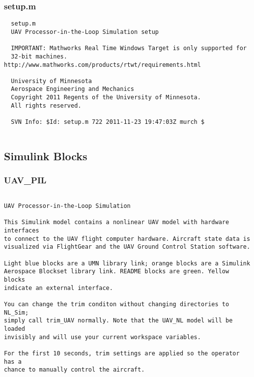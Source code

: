 \documentclass[12pt]{article}
\begin{document}
\subsubsection{setup.m}
\begin{verbatim}
  setup.m
  UAV Processor-in-the-Loop Simulation setup
 
  IMPORTANT: Mathworks Real Time Windows Target is only supported for
  32-bit machines. http://www.mathworks.com/products/rtwt/requirements.html
 
  University of Minnesota
  Aerospace Engineering and Mechanics
  Copyright 2011 Regents of the University of Minnesota.
  All rights reserved.
 
  SVN Info: $Id: setup.m 722 2011-11-23 19:47:03Z murch $


\end{verbatim}

\subsection{Simulink Blocks}
\subsubsection{UAV\_PIL}
\begin{verbatim}

UAV Processor-in-the-Loop Simulation

This Simulink model contains a nonlinear UAV model with hardware interfaces
to connect to the UAV flight computer hardware. Aircraft state data is 
visualized via FlightGear and the UAV Ground Control Station software.

Light blue blocks are a UMN library link; orange blocks are a Simulink
Aerospace Blockset library link. README blocks are green. Yellow blocks
indicate an external interface.

You can change the trim conditon without changing directories to NL_Sim;
simply call trim_UAV normally. Note that the UAV_NL model will be loaded
invisibly and will use your current workspace variables.

For the first 10 seconds, trim settings are applied so the operator has a
chance to manually control the aircraft.

\end{verbatim}
\end{document}
